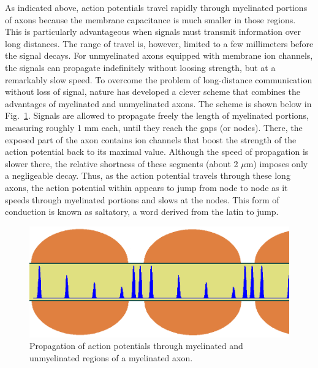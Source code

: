 As indicated above, action potentials travel rapidly through myelinated portions of axons because the membrane capacitance is much smaller in those regions. This is particularly advantageous when signals must transmit information over long distances. The range of travel is, however, limited to a few millimeters before the signal decays. For unmyelinated axons equipped with membrane ion channels, the signals can propagate indefinitely without loosing strength, but at a remarkably slow speed. To overcome the problem of long-distance communication without loss of signal, nature has developed a clever scheme that combines the advantages of myelinated and unmyelinated axons. The scheme is shown below in Fig.~\ref{Fig11-17}. Signals are allowed to propagate freely the length of myelinated portions, measuring roughly 1 mm each, until they reach the gaps (or nodes). There, the exposed part of the axon contains ion channels that boost the strength of the action potential back to its maximal value. Although the speed of propagation is slower there, the relative shortness of these segments (about 2 $\mu$m) imposes only a negligeable decay. Thus, as the action potential travels through these long axons, the action potential within appears to jump from node to node as it speeds through myelinated portions and slows at the nodes. This form of conduction is known as saltatory, a word derived from the latin to jump.
\begin{figure}[!htb]
	\centering
	\includegraphics[width=\textwidth]{./figures/Topic11/Fig11-17.png}
	\caption{Propagation of action potentials through myelinated and unmyelinated regions of a myelinated axon.}
	\label{Fig11-17}
\end{figure} 
